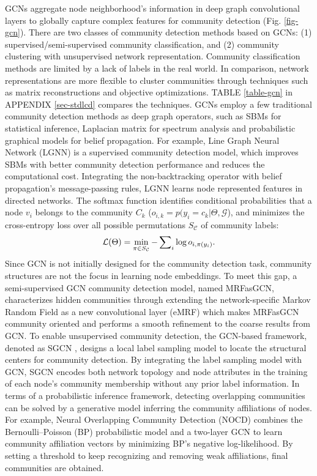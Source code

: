 \label{sec-model-gcn}
GCNs aggregate node neighborhood's information in deep graph convolutional layers to globally capture complex features for community detection (Fig. \ref{fig-gcn}). There are two classes of community detection methods based on GCNs: (1) supervised/semi-supervised community classification, and (2) community clustering with unsupervised network representation. Community classification methods are limited by a lack of labels in the real world. In comparison, network representations are more flexible to cluster communities through techniques such as matrix reconstructions and objective optimizations. TABLE \ref{table-gcn} in APPENDIX \ref{sec-stdlcd} compares the techniques.
GCNs employ a few traditional community detection methods as deep graph operators, such as SBMs for statistical inference, Laplacian matrix for spectrum analysis and probabilistic graphical models for belief propagation. For example, Line Graph Neural Network (LGNN)  is a supervised community detection model, which improves SBMs with better community detection performance and reduces the computational cost. Integrating the non-backtracking operator with belief propagation's message-passing rules, LGNN learns node represented features in directed networks. The softmax function identifies conditional probabilities that a node $v_i$ belongs to the community $C_k$ ($o_{i,k} = p(y_i=c_k|\Theta,\mathcal{G}$), and minimizes the cross-entropy loss over all possible permutations $S_{\mathcal{C}}$ of community labels:
\begin{equation}
\small
\mathcal{L}(\Theta)=\min_{\pi \in S_{\mathcal{C}}}{-\sum\nolimits_i\log{o_{i, \pi(y_{i})}}}.
\end{equation}
Since GCN is not initially designed for the community detection task, community structures are not the focus in learning node embeddings. To meet this gap, a semi-supervised GCN community detection model, named MRFasGCN, characterizes hidden communities through extending the network-specific Markov Random Field as a new convolutional layer (eMRF) which makes MRFasGCN community oriented and performs a smooth refinement to the coarse results from GCN. To enable unsupervised community detection, the GCN-based framework, denoted as SGCN , designs a local label sampling model to locate the structural centers for community detection. By integrating the label sampling model with GCN, SGCN encodes both network topology and node attributes in the training of each node's community membership without any prior label information. 
In terms of a probabilistic inference framework, detecting overlapping communities can be solved by a generative model inferring the community affiliations of nodes. For example, Neural Overlapping Community Detection (NOCD)  combines the Bernoulli–Poisson (BP) probabilistic model and a two-layer GCN to learn community affiliation vectors by minimizing BP's negative log-likelihood. By setting a threshold to keep recognizing and removing weak affiliations, final communities are obtained.
